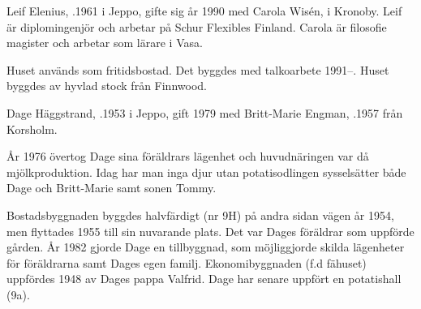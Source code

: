 %



%
Leif Elenius, .1961 i Jeppo, gifte sig år 1990 med Carola Wisén,  i Kronoby. Leif är diplomingenjör och arbetar på Schur Flexibles Finland. Carola är filosofie magister och arbetar som lärare i Vasa.

\begin{jhchildren}
  \item {}
  \item {}
  \item {}
\end{jhchildren}

Huset används som fritidsbostad. Det byggdes med talkoarbete 1991--. Huset byggdes av hyvlad stock från Finnwood.



%



%
Dage Häggstrand, .1953 i Jeppo, gift 1979 med Britt-Marie Engman, .1957 från Korsholm.
\begin{jhchildren}
  \item {}
  \item {}
\end{jhchildren}

År 1976 övertog Dage sina föräldrars lägenhet och huvudnäringen var då mjölkproduktion. Idag har man inga djur utan potatisodlingen sysselsätter både Dage och Britt-Marie samt sonen Tommy.

Bostadsbyggnaden byggdes halvfärdigt (nr 9H) på andra sidan vägen år 1954, men flyttades 1955 till sin nuvarande plats. Det var Dages föräldrar som uppförde gården. År 1982 gjorde Dage en tillbyggnad, som möjliggjorde skilda lägenheter för föräldrarna samt Dages egen familj. Ekonomibyggnaden (f.d fähuset) uppfördes 1948 av Dages pappa Valfrid. Dage har senare uppfört en potatishall (9a).


